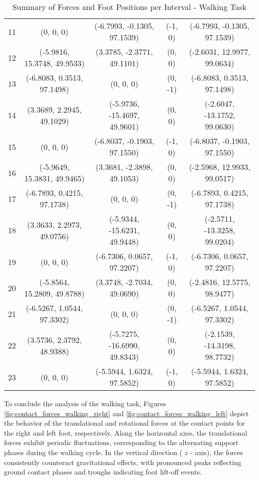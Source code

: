 \documentclass[main.tex]{subfiles}
\begin{document}
\begin{sloppypar}
\begin{table}[H]
{\begin{tabular}{c|c|c|c|c}
            11 & (0, 0, 0) & (-6.7993, -0.1305, 97.1539) & (-1, 0) & (-6.7993, -0.1305, 97.1539) \\
            12 & (-5.9816, 15.3748, 49.9533) & (3.3785, -2.3771, 49.1101) & (0, 0) & (-2.6031, 12.9977, 99.0634) \\
            13 & (-6.8083, 0.3513, 97.1498) & (0, 0, 0) & (0, -1) & (-6.8083, 0.3513, 97.1498) \\
            14 & (3.3689, 2.2945, 49.1029) & (-5.9736, -15.4697, 49.9601) & (0, 0) & (-2.6047, -13.1752, 99.0630) \\
            15 & (0, 0, 0) & (-6.8037, -0.1903, 97.1550) & (-1, 0) & (-6.8037, -0.1903, 97.1550) \\
            16 & (-5.9649, 15.3831, 49.9465) & (3.3681, -2.3898, 49.1053) & (0, 0) & (-2.5968, 12.9933, 99.0517) \\
            17 & (-6.7893, 0.4215, 97.1738) & (0, 0, 0) & (0, -1) & (-6.7893, 0.4215, 97.1738) \\
            18 & (3.3633, 2.2973, 49.0756) & (-5.9344, -15.6231, 49.9448) & (0, 0) & (-2.5711, -13.3258, 99.0204) \\
            19 & (0, 0, 0) & (-6.7306, 0.0657, 97.2207) & (-1, 0) & (-6.7306, 0.0657, 97.2207) \\
            20 & (-5.8564, 15.2809, 49.8788) & (3.3748, -2.7034, 49.0690) & (0, 0) & (-2.4816, 12.5775, 98.9477) \\
            21 & (-6.5267, 1.0544, 97.3302) & (0, 0, 0) & (0, -1) & (-6.5267, 1.0544, 97.3302) \\
            22 & (3.5736, 2.3792, 48.9388) & (-5.7275, -16.6990, 49.8343) & (0, 0) & (-2.1539, -14.3198, 98.7732) \\
            23 & (0, 0, 0) & (-5.5944, 1.6324, 97.5852) & (-1, 0) & (-5.5944, 1.6324, 97.5852) \\
            \hline
        \end{tabular}
    }
    \caption{Summary of Forces and Foot Positions per Interval - Walking Task}
    \label{tab:forces_walking}
\end{table}    
To conclude the analysis of the walking task, Figures \ref{fig:contact_forces_walking_right} and \ref{fig:contact_forces_walking_left} depict the behavior of the translational and rotational forces at the contact points for the right and left foot, respectively. Along the horizontal axes, the translational forces exhibit periodic fluctuations, corresponding to the alternating support phases during the walking cycle. In the vertical direction ( $z$ - axis), the forces consistently counteract gravitational effects, with pronounced peaks reflecting ground contact phases and troughs indicating foot lift-off events.

\end{sloppypar}
\end{document}
